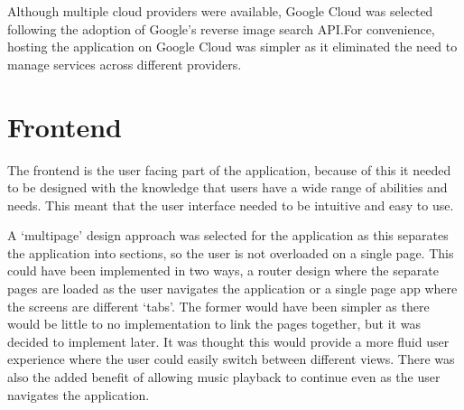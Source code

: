 Although multiple cloud providers were available, Google Cloud was selected following the adoption of Google's reverse image search API.\@ For convenience, hosting the application on Google Cloud was simpler as it eliminated the need to manage services across different providers.

\section{Frontend}
The frontend is the user facing part of the application, because of this it needed to be designed with the knowledge that users have a wide range of abilities and needs. This meant that the user interface needed to be intuitive and easy to use.

A `multipage' design approach was selected for the application as this separates the application into sections, so the user is not overloaded on a single page. This could have been implemented in two ways, a router design where the separate pages are loaded as the user navigates the application or a single page app where the screens are different `tabs'. The former would have been simpler as there would be little to no implementation to link the pages together, but it was decided to implement later. It was thought this would provide a more fluid user experience where the user could easily switch between different views. There was also the added benefit of allowing music playback to continue even as the user navigates the application.

